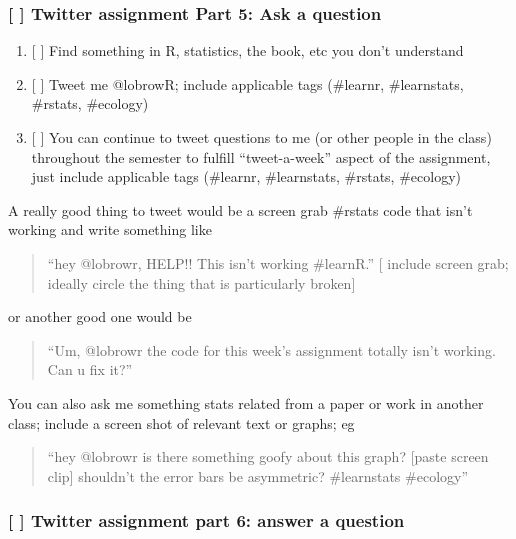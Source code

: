 \documentclass[]{article}
\providecommand{\tightlist}{%
  \setlength{\itemsep}{0pt}\setlength{\parskip}{0pt}}
\begin{document}
\subsubsection{{[} {]} Twitter assignment Part 5: Ask a
question}\label{twitter-assignment-part-5-ask-a-question}

\begin{enumerate}
\def\labelenumi{\arabic{enumi}.}
\tightlist
\item
  {[} {]} Find something in R, statistics, the book, etc you don't
  understand
\item
  {[} {]} Tweet me @lobrowR; include applicable tags (\#learnr,
  \#learnstats, \#rstats, \#ecology)
\item
  {[} {]} You can continue to tweet questions to me (or other people in
  the class) throughout the semester to fulfill ``tweet-a-week'' aspect
  of the assignment, just include applicable tags (\#learnr,
  \#learnstats, \#rstats, \#ecology)
\end{enumerate}

A really good thing to tweet would be a screen grab \#rstats code that
isn't working and write something like

\begin{quote}
``hey @lobrowr, HELP!! This isn't working \#learnR.'' {[} include screen
grab; ideally circle the thing that is particularly broken{]}
\end{quote}

or another good one would be

\begin{quote}
``Um, @lobrowr the code for this week's assignment totally isn't
working. Can u fix it?''
\end{quote}

You can also ask me something stats related from a paper or work in
another class; include a screen shot of relevant text or graphs; eg

\begin{quote}
``hey @lobrowr is there something goofy about this graph? {[}paste
screen clip{]} shouldn't the error bars be asymmetric? \#learnstats
\#ecology''
\end{quote}

\subsubsection{{[} {]} Twitter assignment part 6: answer a
question}\label{twitter-assignment-part-6-answer-a-question}
\end{document}

